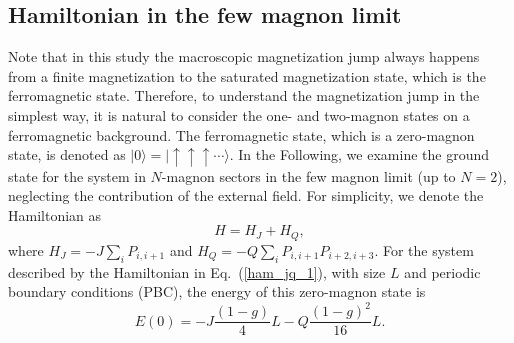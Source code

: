 \documentclass[article,10pt,onecolumn,superscriptaddress,floatfix]{revtex4}
\begin{document}
\subsection{Hamiltonian in the few magnon limit}
Note that in this study the macroscopic magnetization jump always happens from a finite magnetization to the saturated magnetization state, which is the ferromagnetic state. Therefore, to understand the magnetization jump in the simplest way, it is natural to consider the one- and two-magnon states on a ferromagnetic background. The ferromagnetic state, which is a zero-magnon state, is denoted as $|0\rangle=|\uparrow\uparrow\uparrow\cdots\rangle$. In the Following, we examine the ground state for the system in $N$-magnon sectors in the few magnon limit (up to $N=2$), neglecting the contribution of the external field. For simplicity, we denote the Hamiltonian as
\begin{equation}\label{ham_jq_1}
H=H_J + H_Q,
\end{equation}
where $H_J=-J\sum_{i}P_{i,i+1}$ and $H_Q=-Q\sum_{i}P_{i,i+1}P_{i+2,i+3}$. For the system described by the Hamiltonian in Eq.~(\ref{ham_jq_1}), with size $L$ and periodic boundary conditions (PBC), the energy of this zero-magnon state is
\begin{equation}
E(0)=-J\frac{\left(1-g\right)}{4}L-Q\frac{\left(1-g\right)^{2}}{16}L.
\end{equation}
\end{document}
